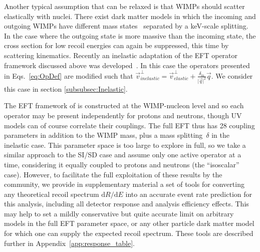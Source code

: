 	    Another typical assumption that can be relaxed is that WIMPs should scatter elastically with nuclei. There exist dark matter models in which the incoming and outgoing WIMPs have different mass states~\cite{InelasticIntro} separated by a keV-scale splitting. In the case where the outgoing state is more massive than the incoming state, the cross section for low recoil energies can again be suppressed, this time by scattering kinematics. Recently an inelastic adaptation of the EFT operator framework discussed above was developed~\cite{InelasticMath}. In this case the operators presented in Eqs.~\ref{eq:OpDef} are modified such that $\vec{v}^\perp_{inelastic} = \vec{v}^\perp_{elastic} +\frac{\delta_m}{\vert{\vec{q}}\vert^2}\vec{q}$. We consider this case in section \ref{subsubsec:Inelastic}.
	    
The EFT framework of \cite{Fitzpatrick:2012ib} is constructed at the WIMP-nucleon level and so each operator may be present independently for protons and neutrons, though UV models can of course correlate their couplings. The full EFT thus has 28 coupling parameters in addition to the WIMP mass, plus a mass splitting~$\delta$ in the inelastic case. This parameter space is too large to explore in full, so we take a similar approach to the SI/SD case 
and assume only one active operator at a time, considering it equally coupled to protons and neutrons (the ``isoscalar'' case). However, to facilitate the full exploitation of these results by the community, we provide in supplementary material a set of tools for converting any theoretical recoil spectrum $\mathrm{d}R/\mathrm{d}E$ into an accurate event rate prediction for this analysis, including all detector response and analysis efficiency effects. This may help to set a mildly conservative but quite accurate limit on arbitrary models in the full EFT parameter space, or any other particle dark matter model for which one can supply the expected recoil spectrum. These tools are described further in Appendix~\ref{app:response_table}.

